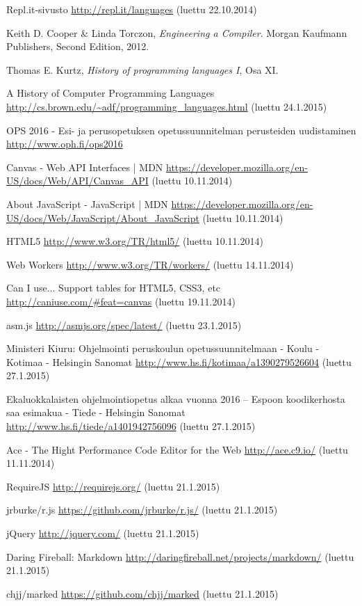 
\begin{thebibliography}{99}

	Repl.it-sivusto \url{http://repl.it/languages} (luettu 22.10.2014)

	Keith D. Cooper \& Linda Torczon,
	\emph{Engineering a Compiler}.
	Morgan Kaufmann Publishers,
	Second Edition,
	2012.

	Thomas E. Kurtz,
	\emph{History of programming languages I}, Osa XI.
	
	
	A History of Computer Programming Languages \url{http://cs.brown.edu/~adf/programming_languages.html} (luettu 24.1.2015)
	
	OPS 2016 - Esi- ja perusopetuksen opetussuunnitelman perusteiden uudistaminen \url{http://www.oph.fi/ops2016}	
	
	Canvas - Web API Interfaces | MDN \url{https://developer.mozilla.org/en-US/docs/Web/API/Canvas_API} (luettu 10.11.2014)

	About JavaScript - JavaScript | MDN \url{https://developer.mozilla.org/en-US/docs/Web/JavaScript/About_JavaScript} (luettu 10.11.2014)
	
	HTML5 \url{http://www.w3.org/TR/html5/} (luettu 10.11.2014)

	Web Workers \url{http://www.w3.org/TR/workers/} (luettu 14.11.2014)

	Can I use... Support tables for HTML5, CSS3, etc \url{http://caniuse.com/#feat=canvas} (luettu 19.11.2014)

	asm.js \url{http://asmjs.org/spec/latest/} (luettu 23.1.2015)

	Ministeri Kiuru: Ohjelmointi peruskoulun opetussuunnitelmaan - Koulu - Kotimaa - Helsingin Sanomat \url{http://www.hs.fi/kotimaa/a1390279526604} (luettu 27.1.2015)
	
	Ekaluokkalaisten ohjelmointiopetus alkaa vuonna 2016 – Espoon koodikerhosta saa esimakua - Tiede - Helsingin Sanomat \url{http://www.hs.fi/tiede/a1401942756096} (luettu 27.1.2015)

	Ace - The Hight Performance Code Editor for the Web \url{http://ace.c9.io/} (luettu 11.11.2014)

	RequireJS \url{http://requirejs.org/} (luettu 21.1.2015)
	
	jrburke/r.js \url{https://github.com/jrburke/r.js/} (luettu 21.1.2015)
	
	jQuery \url{http://jquery.com/} (luettu 21.1.2015)

	Daring Fireball: Markdown \url{http://daringfireball.net/projects/markdown/} (luettu 21.1.2015)
	
	chjj/marked \url{https://github.com/chjj/marked} (luettu 21.1.2015)

\end{thebibliography}

